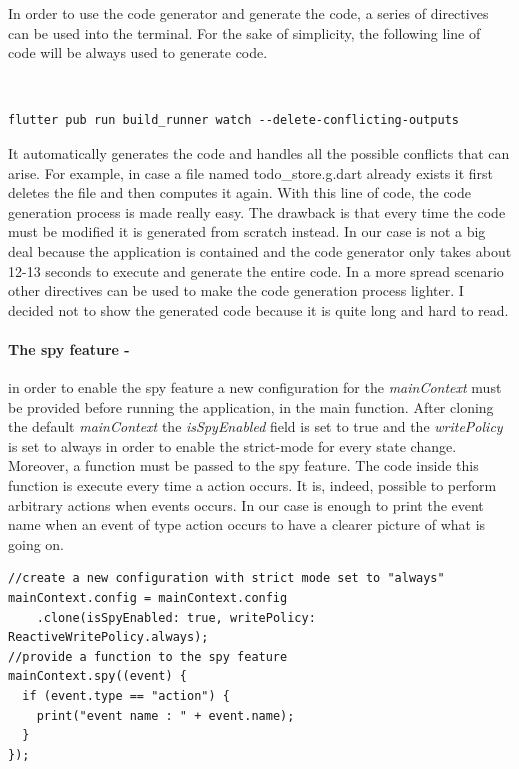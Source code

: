 In order to use the code generator and generate the code, a series of directives can be used into the terminal. For the sake of simplicity, the following line of code will be always used to generate code.
\begin{code}
\mbox{}\\
 \mbox{}
		\label{code:2.127}
\begin{verbatim}
flutter pub run build_runner watch --delete-conflicting-outputs
\end{verbatim}
\mbox{}
\end{code}

It automatically generates the code and handles all the possible conflicts that can arise. For example, in case a file named todo\_store.g.dart already exists it first deletes the file and then computes it again. With this line of code, the code generation process is made really easy. The drawback is that every time the code must be modified it is generated from scratch instead. In our case is not a big deal because the application is contained and the code generator only takes about 12-13 seconds to execute and generate the entire code. In a more spread scenario other directives can be used to make the code generation process lighter. I decided not to show the generated code because it is quite long and hard to read.

\paragraph{The spy feature - }
\label{subpar:todo_app_bloc_core_state} in order to enable the spy feature a new configuration for the \textit{mainContext} must be provided before running the application, in the main function. After cloning the default \textit{mainContext} the \textit{isSpyEnabled} field is set to true and the \textit{writePolicy} is set to always in order to enable the strict-mode for every state change. Moreover, a function must be passed to the spy feature. The code inside this function is execute every time a action occurs. It is, indeed, possible to perform arbitrary actions when events occurs. In our case is enough to print the event name when an event of type action occurs to have a clearer picture of what is going on.

\begin{code}
\mbox{}
 \mbox{}
		\label{code:2.14}
\begin{verbatim}
//create a new configuration with strict mode set to "always"
mainContext.config = mainContext.config
    .clone(isSpyEnabled: true, writePolicy: ReactiveWritePolicy.always);
//provide a function to the spy feature
mainContext.spy((event) {
  if (event.type == "action") {
    print("event name : " + event.name);
  }
});
\end{verbatim}
\mbox{}
\end{code}


